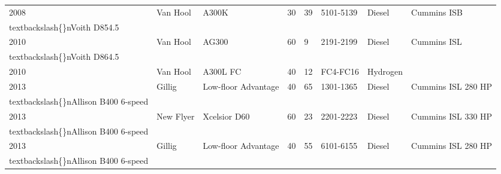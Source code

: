 \documentclass{article}
\begin{document}
\begin{tabular}{llllllll}
2008 & Van Hool & A300K & 30 & 39 & 5101-5139 & Diesel & Cummins ISB\\textbackslash\{\}nVoith D854.5 \\
2010 & Van Hool & AG300 & 60 & 9 & 2191-2199 & Diesel & Cummins ISL\\textbackslash\{\}nVoith D864.5 \\
2010 & Van Hool & A300L FC & 40 & 12 & FC4-FC16 & Hydrogen &  \\
2013 & Gillig & Low-floor Advantage & 40 & 65 & 1301-1365 & Diesel & Cummins ISL 280 HP \\textbackslash\{\}nAllison B400 6-speed \\
2013 & New Flyer & Xcelsior D60 & 60 & 23 & 2201-2223 & Diesel & Cummins ISL 330 HP\\textbackslash\{\}nAllison B400 6-speed \\
2013 & Gillig & Low-floor Advantage & 40 & 55 & 6101-6155 & Diesel & Cummins ISL 280 HP\\textbackslash\{\}nAllison B400 6-speed \\
\bottomrule
\end{tabular}
\end{document}
